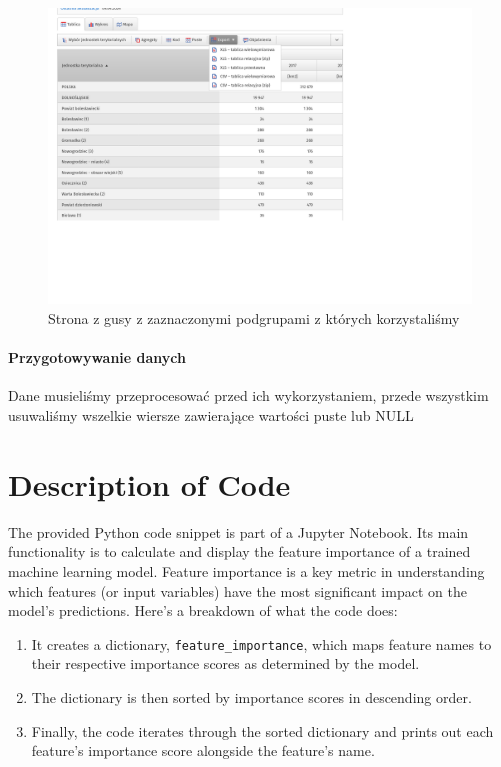 \documentclass[12pt]{article}
\begin{document}
\begin{figure}[h]
    \caption{Strona z gusy z zaznaczonymi podgrupami z których korzystaliśmy}
    \centering
    \includegraphics[width=1.0\textwidth]{dane5}
\end{figure}

\paragraph{Przygotowywanie danych}
Dane musieliśmy przeprocesować przed ich wykorzystaniem, przede wszystkim usuwaliśmy wszelkie wiersze zawierające wartości puste lub NULL
\section*{Description of Code}

The provided Python code snippet is part of a Jupyter Notebook. Its main functionality is to calculate and display the feature importance of a trained machine learning model. Feature importance is a key metric in understanding which features (or input variables) have the most significant impact on the model's predictions. Here's a breakdown of what the code does:

\begin{enumerate}
    \item It creates a dictionary, \texttt{feature\_importance}, which maps feature names to their respective importance scores as determined by the model.
    \item The dictionary is then sorted by importance scores in descending order.
    \item Finally, the code iterates through the sorted dictionary and prints out each feature's importance score alongside the feature's name.
\end{enumerate}
\end{document}
